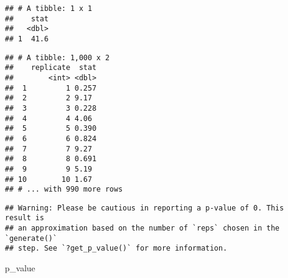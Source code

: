 \documentclass[]{article}
\newenvironment{Shaded}{\begin{snugshade}}{\end{snugshade}}
\newcommand{\DataTypeTok}[1]{\textcolor[rgb]{0.13,0.29,0.53}{#1}}
\newcommand{\DecValTok}[1]{\textcolor[rgb]{0.00,0.00,0.81}{#1}}
\newcommand{\KeywordTok}[1]{\textcolor[rgb]{0.13,0.29,0.53}{\textbf{#1}}}
\newcommand{\NormalTok}[1]{#1}
\newcommand{\OperatorTok}[1]{\textcolor[rgb]{0.81,0.36,0.00}{\textbf{#1}}}
\newcommand{\StringTok}[1]{\textcolor[rgb]{0.31,0.60,0.02}{#1}}
\begin{document}
\begin{verbatim}
## # A tibble: 1 x 1
##    stat
##   <dbl>
## 1  41.6
\end{verbatim}

\begin{Shaded}
\end{Shaded}

\begin{verbatim}
## # A tibble: 1,000 x 2
##    replicate  stat
##        <int> <dbl>
##  1         1 0.257
##  2         2 9.17 
##  3         3 0.228
##  4         4 4.06 
##  5         5 0.390
##  6         6 0.824
##  7         7 9.27 
##  8         8 0.691
##  9         9 5.19 
## 10        10 1.67 
## # ... with 990 more rows
\end{verbatim}

\begin{Shaded}
\end{Shaded}

\begin{verbatim}
## Warning: Please be cautious in reporting a p-value of 0. This result is
## an approximation based on the number of `reps` chosen in the `generate()`
## step. See `?get_p_value()` for more information.
\end{verbatim}

\begin{Shaded}
\begin{Highlighting}[]
\NormalTok{p_value}
\end{Highlighting}
\end{Shaded}
\end{document}
